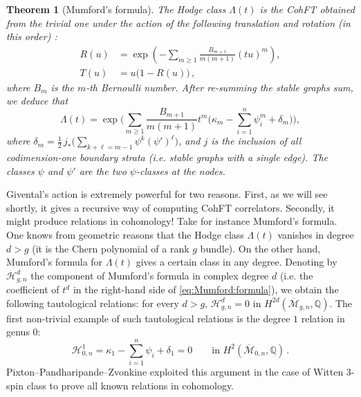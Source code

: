 \documentclass[11pt,reqno]{amsart}
\numberwithin{equation}{section}
\newcommand{\mb}[1]{\mathbb{#1}}
\newcommand{\mc}[1]{\mathcal{#1}}
\newcommand{\Q}{\mb{Q}}
\newcommand{\M}{\mc{M}}
\newcommand{\Mbar}{\overline{\M}}
\theoremstyle{plain}
\newtheorem{theorem}{Theorem}[section]
\theoremstyle{definition}
\begin{document}
\begin{theorem}[Mumford's formula]
  The Hodge class $\Lambda(t)$ is the CohFT obtained from the trivial one under the action of the following translation and rotation (in this order) \cite{Mum83}:
  \begin{equation}
  \begin{split}
    R(u)
    &=
    \exp\left(
      - \sum_{m \ge 1} \frac{B_{m+1}}{m(m+1)} (tu)^m
    \right), \\
    T(u)
    &=
    u \bigl( 1 - R(u) \bigr) \,,
  \end{split}
  \end{equation}
  where $B_m$ is the $m$-th Bernoulli number. After re-summing the stable graphs sum, we deduce that
  \begin{equation}\label{eq:Mumford:formula}
    \Lambda(t)
    =
    \exp\Biggl( \sum_{m \ge 1} \frac{B_{m+1}}{m(m+1)} t^m \biggl(
      \kappa_m
      -
      \sum_{i=1}^n \psi_i^m
      +
      \delta_m
    \biggr)\Biggr),
  \end{equation}
  where $\delta_m = \frac{1}{2} \, j_{\ast} \bigl( \sum_{k + \ell = m-1} \psi^{k} (\psi')^{\ell} \bigr)$, and $j$ is the inclusion of all codimension-one boundary strata (i.e. stable graphs with a single edge). The classes $\psi$ and $\psi'$ are the two $\psi$-classes at the nodes.
\end{theorem}

Givental's action is extremely powerful for two reasons. First, as we will see shortly, it gives a recursive way of computing CohFT correlators. Secondly, it might produce relations in cohomology! Take for instance Mumford's formula. One knows from geometric reasons that the Hodge class $\Lambda(t)$ vanishes in degree $d > g$ (it is the Chern polynomial of a rank $g$ bundle). On the other hand, Mumford's formula for $\Lambda(t)$ gives a certain class in any degree. Denoting by $\mc{H}_{g,n}^{d}$ the component of Mumford's formula in complex degree $d$ (i.e. the coefficient of $t^d$ in the right-hand side of \cref{eq:Mumford:formula}), we obtain the following tautological relations: for every $d > g$, $\mc{H}_{g,n}^{d} = 0$ in $H^{2d}(\Mbar_{g,n},\Q)$. The first non-trivial example of such tautological relations is the degree $1$ relation in genus $0$:
\begin{equation}
  \mc{H}_{0,n}^{1}
  =
  \kappa_1 - \sum_{i=1}^n \psi_i + \delta_1 = 0
  \qquad
  \text{in }
  H^{2}(\Mbar_{0,n},\Q) \,.
\end{equation}
Pixton--Pandharipande--Zvonkine \cite{PPZ15} exploited this argument in the case of Witten $3$-spin class to prove all known relations in cohomology.
\end{document}
